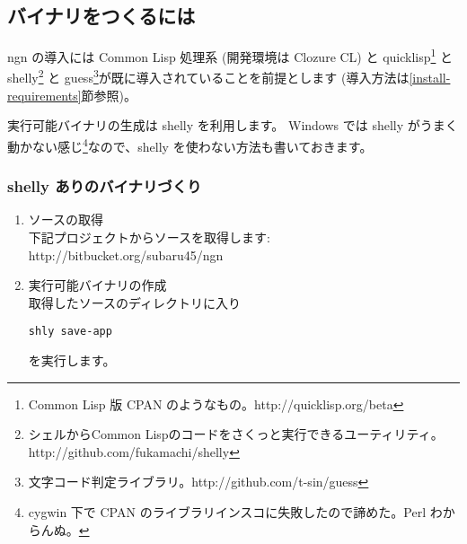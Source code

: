 \documentclass[a4j]{jsarticle}
\begin{document}
\subsection{バイナリをつくるには}
ngn の導入には Common Lisp 処理系 (開発環境は Clozure CL) と quicklisp\footnote{Common Lisp 版 CPAN のようなもの。http://quicklisp.org/beta} と shelly\footnote{シェルからCommon Lispのコードをさくっと実行できるユーティリティ。http://github.com/fukamachi/shelly} と guess\footnote{文字コード判定ライブラリ。http://github.com/t-sin/guess}が既に導入されていることを前提とします (導入方法は\ref{install-requirements}節参照)。

実行可能バイナリの生成は shelly を利用します。
Windows では shelly がうまく動かない感じ\footnote{cygwin 下で CPAN のライブラリインスコに失敗したので諦めた。Perl わからんぬ。}なので、shelly を使わない方法も書いておきます。


\subsubsection{shelly ありのバイナリづくり}

\begin{enumerate}
  \item ソースの取得 \\
    下記プロジェクトからソースを取得します: \\
    http://bitbucket.org/subaru45/ngn \\

  \item 実行可能バイナリの作成 \\
    取得したソースのディレクトリに入り
\begin{lstlisting}
shly save-app
\end{lstlisting}
を実行します。
\end{enumerate}
\end{document}
